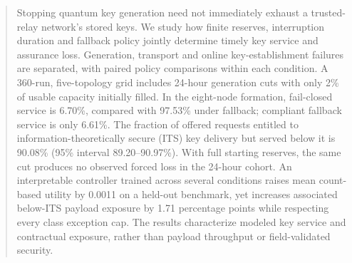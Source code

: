 \begin{abstract}
Stopping quantum key generation need not immediately exhaust a trusted-relay network's stored keys. We study how finite reserves, interruption duration and fallback policy jointly determine timely key service and assurance loss. Generation, transport and online key-establishment failures are separated, with paired policy comparisons within each condition. A 360-run, five-topology grid includes 24-hour generation cuts with only 2\% of usable capacity initially filled. In the eight-node formation, fail-closed service is 6.70\%, compared with 97.53\% under fallback; compliant fallback service is only 6.61\%. The fraction of offered requests entitled to information-theoretically secure (ITS) key delivery but served below it is 90.08\% (95\% interval 89.20--90.97\%). With full starting reserves, the same cut produces no observed forced loss in the 24-hour cohort. An interpretable controller trained across several conditions raises mean count-based utility by 0.0011 on a held-out benchmark, yet increases associated below-ITS payload exposure by 1.71 percentage points while respecting every class exception cap. The results characterize modeled key service and contractual exposure, rather than payload throughput or field-validated security.
\end{abstract}
